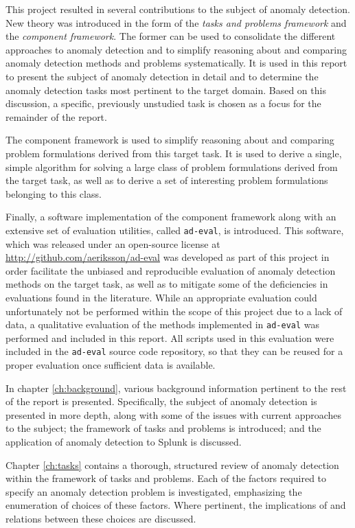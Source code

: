 This project resulted in several contributions to the subject of anomaly detection. New theory was introduced in the form of the \emph{tasks and problems framework} and the \emph{component framework}. The former can be used to consolidate the different approaches to anomaly detection and to simplify reasoning about and comparing anomaly detection methods and problems systematically. It is used in this report to present the subject of anomaly detection in detail and to determine the anomaly detection tasks most pertinent to the target domain. Based on this discussion, a specific, previously unstudied task is chosen as a focus for the remainder of the report.

The component framework is used to simplify reasoning about and comparing problem formulations derived from this target task. It is used to derive a single, simple algorithm for solving a large class of problem formulations derived from the target task, as well as to derive a set of interesting problem formulations belonging to this class.

Finally, a software implementation of the component framework along with an extensive set of evaluation utilities, called \texttt{ad-eval}, is introduced. This software, which was released under an open-source license at \url{http://github.com/aeriksson/ad-eval} was developed as part of this project in order facilitate the unbiased and reproducible evaluation of anomaly detection methods on the target task, as well as to mitigate some of the deficiencies in evaluations found in the literature. While an appropriate evaluation could unfortunately not be performed within the scope of this project due to a lack of data, a qualitative evaluation of the methods implemented in \texttt{ad-eval} was performed and included in this report. All scripts used in this evaluation were included in the \texttt{ad-eval} source code repository, so that they can be reused for a proper evaluation once sufficient data is available.

In chapter \ref{ch:background}, various background information pertinent to the rest of the report is presented. Specifically, the subject of anomaly detection is presented in more depth, along with some of the issues with current approaches to the subject; the framework of tasks and problems is introduced; and the application of anomaly detection to Splunk is discussed. 

Chapter \ref{ch:tasks} contains a thorough, structured review of anomaly detection within the framework of tasks and problems. Each of the factors required to specify an anomaly detection problem is investigated, emphasizing the enumeration of choices of these factors. Where pertinent, the implications of and relations between these choices are discussed.

